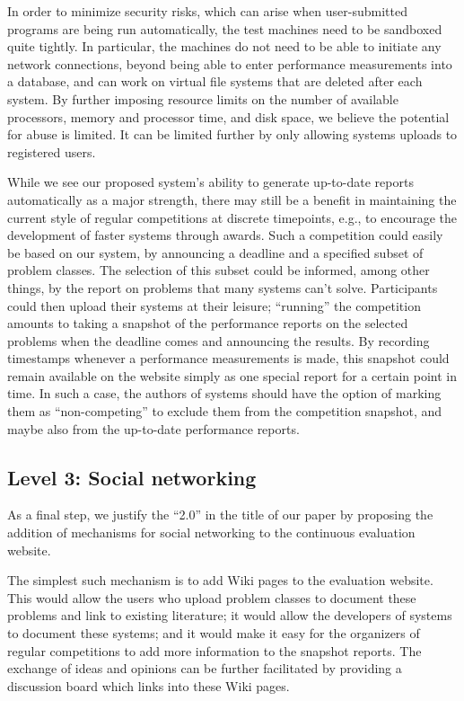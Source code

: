 In order to minimize security risks, which can arise when
user-submitted programs are being run automatically, the test machines
need to be sandboxed quite tightly.  In particular, the machines do
not need to be able to initiate any network connections, beyond being
able to enter performance measurements into a database, and can work
on virtual file systems that are deleted after each system.  By
further imposing resource limits on the number of available
processors, memory and processor time, and disk space, we believe the
potential for abuse is limited.  It can be limited further by only
allowing systems uploads to registered users.

While we see our proposed system's ability to generate up-to-date
reports automatically as a major strength, there may still be a
benefit in maintaining the current style of regular competitions at
discrete timepoints, e.g., to encourage the development of faster
systems through awards.  Such a competition could easily be based on
our system, by announcing a deadline and a specified subset of problem
classes. The selection of this subset could be informed, among other
things, by the report on problems that many systems can't
solve. Participants could then upload their systems at their leisure;
``running'' the competition amounts to taking a snapshot of the
performance reports on the selected problems when the deadline comes
and announcing the results.  By recording timestamps whenever a
performance measurements is made, this snapshot could remain available
on the website simply as one special report for a certain point in
time.  In such a case, the authors of systems should have the option
of marking them as ``non-competing'' to exclude them from the
competition snapshot, and maybe also from the up-to-date performance
reports.



\subsection{Level 3: Social networking}

As a final step, we justify the ``2.0'' in the title of our paper by
proposing the addition of mechanisms for social networking to the
continuous evaluation website.

The simplest such mechanism is to add Wiki pages to the evaluation
website.  This would allow the users who upload problem classes to
document these problems and link to existing literature; it would
allow the developers of systems to document these systems; and it
would make it easy for the organizers of regular competitions to add
more information to the snapshot reports.  The exchange of ideas and
opinions can be further facilitated by providing a discussion board
which links into these Wiki pages.

